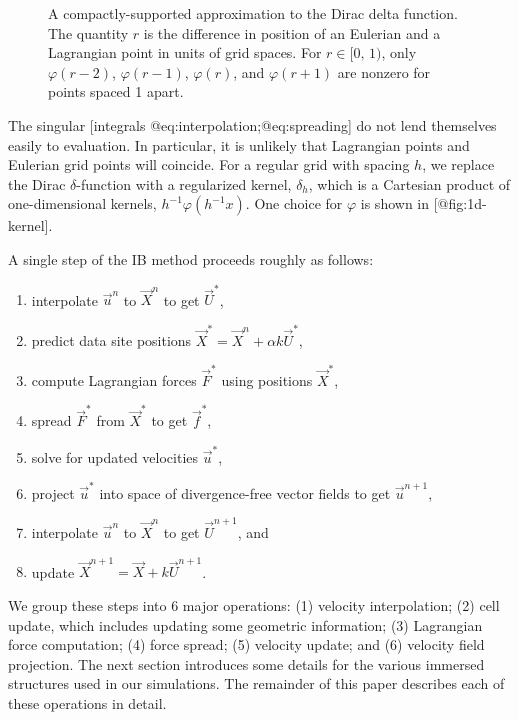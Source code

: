 \begin{figure}[thb]
    \centering
    \caption{%
        A compactly-supported approximation to the Dirac delta function. The
        quantity $r$ is the difference in position of an Eulerian and
        a Lagrangian point in units of grid spaces. For $r\in[0,\,1)$, only
        $\varphi(r-2)$, $\varphi(r-1)$, $\varphi(r)$, and $\varphi(r+1)$ are
        nonzero for points spaced 1 apart.
    }
    \label{fig:1d-kernel}
\end{figure}

The singular [integrals @eq:interpolation;@eq:spreading] do not lend themselves
easily to evaluation. In particular, it is unlikely that Lagrangian points and
Eulerian grid points will coincide. For a regular grid with spacing $h$, we
replace the Dirac $\delta$-function with a regularized kernel, $\delta_h$,
which is a Cartesian product of one-dimensional kernels,
$h^{-1}\varphi(h^{-1}x)$. One choice for $\varphi$ is shown in [@fig:1d-kernel]. 

A single step of the IB method proceeds roughly as follows:
\begin{enumerate}[label=(\texttt{\alph*})]
    \item interpolate $\vec{u}^n$ to $\vec{X}^n$ to get $\vec{U}^\ast$,
    \item predict data site positions $\vec{X}^\ast = \vec{X}^n + \alpha k\vec{U}^\ast$,
    \item compute Lagrangian forces $\vec{F}^\ast$ using positions $\vec{X}^\ast$,
    \item spread $\vec{F}^\ast$ from $\vec{X}^\ast$ to get $\vec{f}^\ast$,
    \item solve for updated velocities $\vec{u}^\ast$,
    \item project $\vec{u}^\ast$ into space of divergence-free vector fields to
        get $\vec{u}^{n+1}$,
    \item interpolate $\vec{u}^{n}$ to $\vec{X}^{n}$ to get $\vec{U}^{n+1}$, and
    \item update $\vec{X}^{n+1} = \vec{X} + k \vec{U}^{n+1}$.
\end{enumerate}
We group these steps into 6 major operations: (1) velocity interpolation;
(2) cell update, which includes updating some geometric information; (3)
Lagrangian force computation; (4) force spread; (5) velocity update; and (6)
velocity field projection. The next section introduces some details for the
various immersed structures used in our simulations. The remainder of this
paper describes each of these operations in detail.
